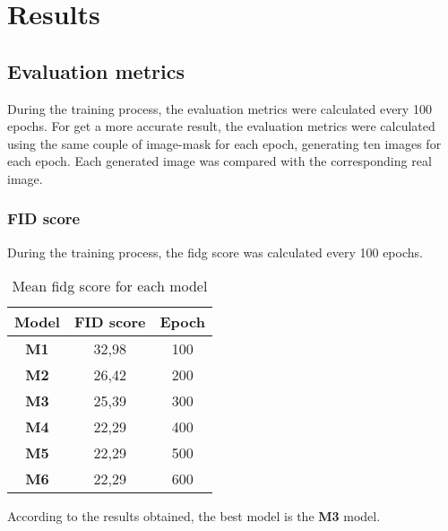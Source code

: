 
\section{Results}\label{sec:results}
\subsection{Evaluation metrics}
During the training process, the evaluation metrics were calculated every 100 epochs.
For get a more accurate result, the evaluation metrics were calculated using the same couple of image-mask for each epoch, generating ten images for each epoch.
Each generated image was compared with the corresponding real image.
\subsubsection{FID score}
During the training process, the \gls{fidg} score was calculated every 100 epochs. 
\begin{table}[H]
    \centering
    \begin{tabular}{|c|c|c|}
        \hline
        \textbf{Model} & \textbf{FID score} & \textbf{Epoch} \\
        \hline
        \hline
        \textbf{M1} & 32,98 & 100 \\
        \hline
        \textbf{M2} & 26,42 & 200 \\
        \hline
        \textbf{M3} & 25,39 & 300 \\
        \hline
        \textbf{M4} & 22,29 & 400 \\
        \hline
        \textbf{M5} & 22,29 & 500 \\
        \hline
        \textbf{M6} & 22,29 & 600 \\
    \end{tabular}
    \caption{Mean \gls{fidg} score for each model}\label{tab:fid-score}
\end{table}
According to the results obtained, the best model is the \textbf{M3} model.

